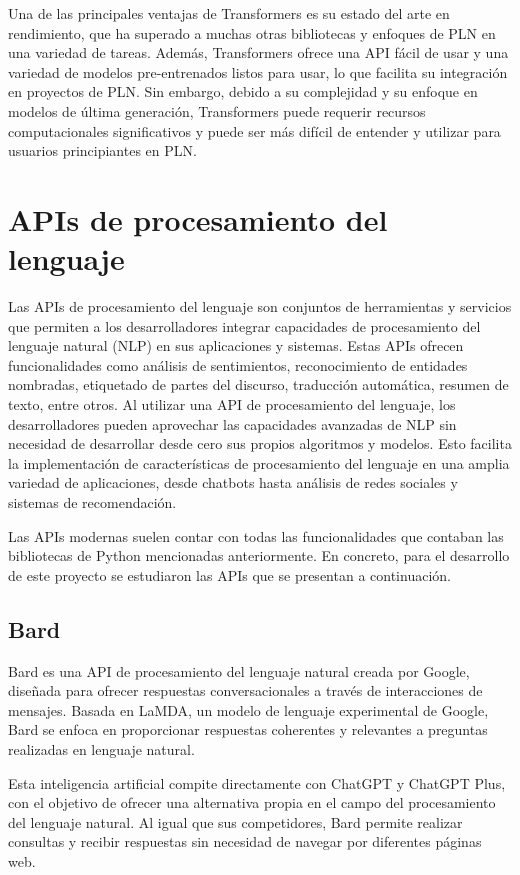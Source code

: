 Una de las principales ventajas de Transformers es su estado del arte en rendimiento, que ha superado a muchas otras bibliotecas y enfoques de PLN en una variedad de tareas. Además, Transformers ofrece una API fácil de usar y una variedad de modelos pre-entrenados listos para usar, lo que facilita su integración en proyectos de PLN. Sin embargo, debido a su complejidad y su enfoque en modelos de última generación, Transformers puede requerir recursos computacionales significativos y puede ser más difícil de entender y utilizar para usuarios principiantes en PLN.

\section{APIs de procesamiento del lenguaje}

Las APIs de procesamiento del lenguaje son conjuntos de herramientas y servicios que permiten a los desarrolladores integrar capacidades de procesamiento del lenguaje natural (NLP) en sus aplicaciones y sistemas. Estas APIs ofrecen funcionalidades como análisis de sentimientos, reconocimiento de entidades nombradas, etiquetado de partes del discurso, traducción automática, resumen de texto, entre otros. Al utilizar una API de procesamiento del lenguaje, los desarrolladores pueden aprovechar las capacidades avanzadas de NLP sin necesidad de desarrollar desde cero sus propios algoritmos y modelos. Esto facilita la implementación de características de procesamiento del lenguaje en una amplia variedad de aplicaciones, desde chatbots hasta análisis de redes sociales y sistemas de recomendación.

Las APIs modernas suelen contar con todas las funcionalidades que contaban las bibliotecas de Python mencionadas anteriormente. En concreto, para el desarrollo de este proyecto se estudiaron las APIs que se presentan a continuación.

\subsection{Bard}
Bard es una API de procesamiento del lenguaje natural creada por Google, diseñada para ofrecer respuestas conversacionales a través de interacciones de mensajes. Basada en LaMDA, un modelo de lenguaje experimental de Google, Bard se enfoca en proporcionar respuestas coherentes y relevantes a preguntas realizadas en lenguaje natural.

Esta inteligencia artificial compite directamente con ChatGPT y ChatGPT Plus, con el objetivo de ofrecer una alternativa propia en el campo del procesamiento del lenguaje natural. Al igual que sus competidores, Bard permite realizar consultas y recibir respuestas sin necesidad de navegar por diferentes páginas web.


